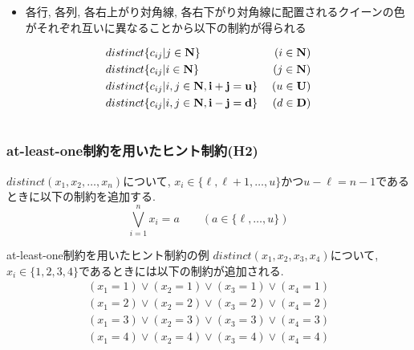 \begin{frame}
\begin{columns}
\begin{column}{0.7\textwidth}
{\begin{block}{}
\begin{itemize}
                \item \alert{各行}, \alert{各列}, \alert{各右上がり対角線}, \alert{各右下がり対角線}に配置されるクイーンの色がそれぞれ互いに異なることから以下の制約が得られる
            \end{itemize}
            \vspace{-0.5\baselineskip}           %
            \begin{eqnarray*}
& distinct\{c_{ij} | j \in \bf N\} \; & (i \in \bf N)\\
& distinct\{c_{ij} | i \in \bf N\} \; & (j \in \bf N)\\
& distinct\{c_{ij} | i, j \in \bf N,  i+j=u\} \; & (u \in \bf U)\\
& distinct\{c_{ij} | i, j \in \bf N,  i-j=d\} \; & (d \in \bf D)
            \end{eqnarray*}
        \end{block}
    }
        \end{column}
    \end{columns}
\end{frame}


\begin{frame}
    \frametitle{at-least-one制約を用いたヒント制約(H2)}
    \vspace{-3mm}
    \begin{block}{}
        $distinct(x_1,x_2,\ldots,x_n)$について, $x_i \in \{\ell, \ell+1,\ldots, u\}$かつ$u-\ell=n-1$であるときに以下の制約を追加する.\\
        \vspace{-3mm}
        $$\bigvee_{i=1}^n x_i=a \qquad (a \in \{\ell,\ldots, u\})$$
    \end{block}
    \begin{exampleblock}{at-least-one制約を用いたヒント制約の例}
        $distinct(x_1, x_2, x_3, x_4)$について, $x_i \in \{1, 2, 3, 4\}$であるときには以下の制約が追加される.
        \vspace{-3mm}
        \begin{eqnarray*}
            (x_1=1) \lor (x_2=1) \lor (x_3=1) \lor (x_4=1)\\
            (x_1=2) \lor (x_2=2) \lor (x_3=2) \lor (x_4=2)\\
            (x_1=3) \lor (x_2=3) \lor (x_3=3) \lor (x_4=3)\\
            (x_1=4) \lor (x_2=4) \lor (x_3=4) \lor (x_4=4)
        \end{eqnarray*}

    \end{exampleblock}
\end{frame}


